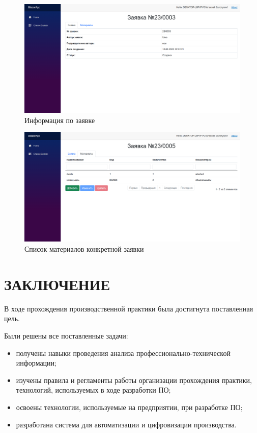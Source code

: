 \documentclass[a4paper,14pt]{extreport}
\begin{document}
\begin{figure}[H]
	\centering
	\includegraphics[width=1\linewidth]{"Screenshot 2023-08-20 113430"}
	\caption{Информация по заявке}
	\label{fig:reqInfo}
\end{figure}

\begin{figure}[H]
	\centering
	\includegraphics[width=1\linewidth]{"Screenshot 2023-08-20 113513"}
	\caption{Список материалов конкретной заявки}
	\label{fig:reqMaterials}
\end{figure}

	
	\chapter*{ЗАКЛЮЧЕНИЕ}
	
	В ходе прохождения производственной практики была достигнута поставленная цель.
	
	Были решены все поставленные задачи:
	\begin{itemize}
		\item получены навыки проведения анализа профессионально-технической информации; 
		\item изучены правила и регламенты работы организации прохождения практики, технологий, используемых в ходе разработки ПО; 
		\item освоены технологии, используемые на предприятии, при разработке ПО;
		\item разработана система для автоматизации и цифровизации производства.
	\end{itemize}

\newpage

\renewcommand\bibname{СПИСОК ИСПОЛЬЗОВАННЫХ ИСТОЧНИКОВ}
 

\end{document}
